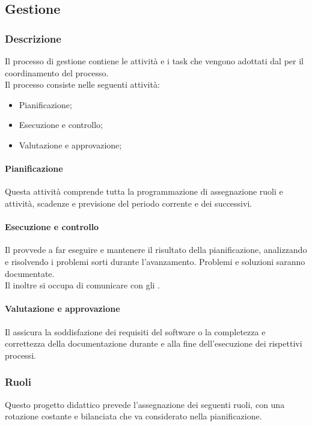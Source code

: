 \subsection{Gestione}

\subsubsection{Descrizione}
Il processo di gestione contiene le attività e i task che vengono adottati dal \Responsabile{} per il coordinamento del processo.\\
Il processo consiste nelle seguenti attività:
\begin{itemize}
  \item Pianificazione;
  \item Esecuzione e controllo;
  \item Valutazione e approvazione;
\end{itemize}

\paragraph{Pianificazione}
Questa attività comprende tutta la programmazione di assegnazione ruoli e attività, scadenze e previsione del periodo corrente e dei successivi.

\paragraph{Esecuzione e controllo}
Il \Responsabile{} provvede a far eseguire e mantenere il risultato della pianificazione, analizzando e risolvendo i problemi sorti durante l'avanzamento. Problemi e soluzioni saranno documentate.\\
Il \Responsabile{} inoltre si occupa di comunicare con gli .

\paragraph{Valutazione e approvazione}
Il \Responsabile{} assicura la soddisfazione dei requisiti del software o la completezza e correttezza della documentazione durante e alla fine dell'esecuzione dei rispettivi processi.

\subsubsection{Ruoli}
Questo progetto didattico prevede l'assegnazione dei seguenti ruoli, con una rotazione costante e bilanciata che va considerato nella pianificazione.

